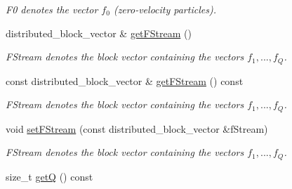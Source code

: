 \begin{DoxyCompactItemize}
\begin{DoxyCompactList}\small\item\em F0 denotes the vector $ f_0 $ (zero-\/velocity particles). \item\end{DoxyCompactList}\item 
\hypertarget{classnatrium_1_1DistributionFunctions_a74dfe8e6ac6d5f463dcb8220f37800a3}{
distributed\_\-block\_\-vector \& \hyperlink{classnatrium_1_1DistributionFunctions_a74dfe8e6ac6d5f463dcb8220f37800a3}{getFStream} ()}
\label{classnatrium_1_1DistributionFunctions_a74dfe8e6ac6d5f463dcb8220f37800a3}

\begin{DoxyCompactList}\small\item\em FStream denotes the block vector containing the vectors $ f_1, ..., f_Q $. \item\end{DoxyCompactList}\item 
\hypertarget{classnatrium_1_1DistributionFunctions_a88224d528262c522ea2ad8bec11178c1}{
const distributed\_\-block\_\-vector \& \hyperlink{classnatrium_1_1DistributionFunctions_a88224d528262c522ea2ad8bec11178c1}{getFStream} () const }
\label{classnatrium_1_1DistributionFunctions_a88224d528262c522ea2ad8bec11178c1}

\begin{DoxyCompactList}\small\item\em FStream denotes the block vector containing the vectors $ f_1, ..., f_Q $. \item\end{DoxyCompactList}\item 
\hypertarget{classnatrium_1_1DistributionFunctions_ad0ada0c54968a61f78eb1b82eb6c5a68}{
void \hyperlink{classnatrium_1_1DistributionFunctions_ad0ada0c54968a61f78eb1b82eb6c5a68}{setFStream} (const distributed\_\-block\_\-vector \&fStream)}
\label{classnatrium_1_1DistributionFunctions_ad0ada0c54968a61f78eb1b82eb6c5a68}

\begin{DoxyCompactList}\small\item\em FStream denotes the block vector containing the vectors $ f_1, ..., f_Q $. \item\end{DoxyCompactList}\item 
\hypertarget{classnatrium_1_1DistributionFunctions_a2ab8e5abf8cdef76f62e443a8dde5fd4}{
size\_\-t \hyperlink{classnatrium_1_1DistributionFunctions_a2ab8e5abf8cdef76f62e443a8dde5fd4}{getQ} () const }
\label{classnatrium_1_1DistributionFunctions_a2ab8e5abf8cdef76f62e443a8dde5fd4}


\end{DoxyCompactItemize}
